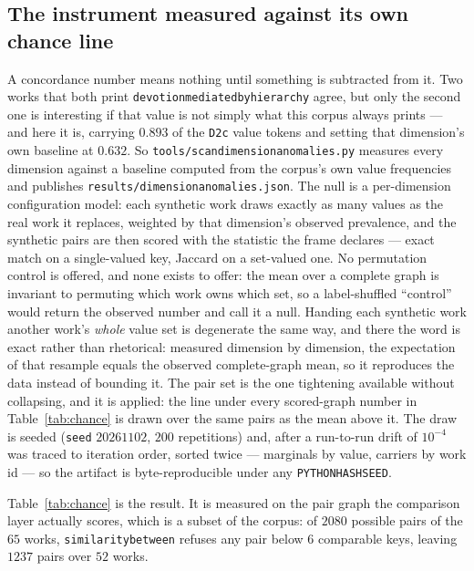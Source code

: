 \documentclass[11pt]{article}
\DeclareRobustCommand{\_}{\textunderscore\allowbreak}
\newcommand{\dimkey}[1]{\texttt{\small #1}}
\newcommand{\field}[1]{\texttt{\small #1}}
\begin{document}
\subsection{The instrument measured against its own chance line}
\label{sec:anomalies}

A concordance number means nothing until something is subtracted from it. Two works
that both print \field{devotion\_mediated\_by\_hierarchy} agree, but only the second
one is interesting if that value is not simply what this corpus always prints --- and
here it is, carrying \(0.893\) of the \dimkey{D2c} value tokens and setting that
dimension's own baseline at \(0.632\). So
\texttt{tools/scan\_dimension\_anomalies.py} measures every dimension against a
baseline computed from the corpus's own value frequencies and publishes
\texttt{results/dimension\_anomalies.json}. The null is a per-dimension configuration
model: each synthetic work draws exactly as many values as the real work it replaces,
weighted by that dimension's observed prevalence, and the synthetic pairs are then
scored with the statistic the frame declares --- exact match on a single-valued key,
Jaccard on a set-valued one. No permutation control is offered, and none exists to
offer: the mean over a complete graph is invariant to permuting which work owns which
set, so a label-shuffled ``control'' would return the observed number and call it a
null. Handing each synthetic work another work's \emph{whole} value set is degenerate the
same way, and there the word is exact rather than rhetorical: measured dimension by
dimension, the expectation of that resample equals the observed complete-graph mean, so it
reproduces the data instead of bounding it. The pair set is the one tightening available
without collapsing, and it is applied: the line under every scored-graph number in
Table~\ref{tab:chance} is drawn over the same pairs as the mean above it. The draw is seeded (\texttt{seed} \(20261102\), \(200\) repetitions) and, after
a run-to-run drift of \(10^{-4}\) was traced to iteration order, sorted twice ---
marginals by value, carriers by work id --- so the artifact is byte-reproducible under
any \texttt{PYTHONHASHSEED}.

Table~\ref{tab:chance} is the result. It is measured on the pair graph the comparison
layer actually scores, which is a subset of the corpus: of \(2080\) possible pairs of
the \(65\) works, \texttt{similarity\_between} refuses any pair below \(6\) comparable
keys, leaving \(1237\) pairs over \(52\) works.
\end{document}
